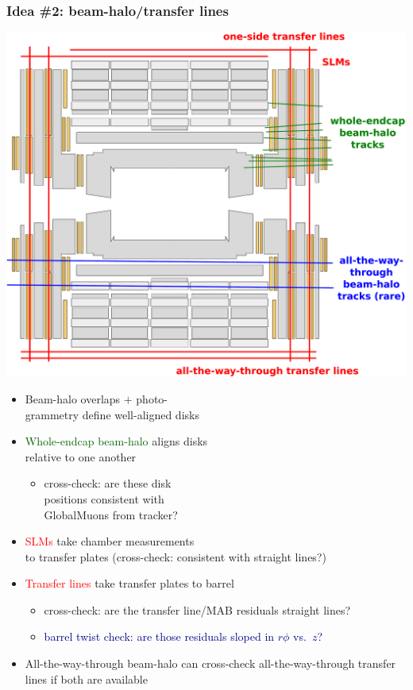 \documentclass[compress]{beamer}
\begin{document}
\begin{frame}
\frametitle{Idea \#2: beam-halo/transfer lines}

\vspace{0.2 cm}
\hfill \includegraphics[width=0.4\linewidth]{beamhalo_transferlines.pdf}

\vspace{-4 cm}
\begin{itemize}
\item Beam-halo overlaps $+$ photo- \\ grammetry define well-aligned disks

\item \textcolor{darkgreen}{Whole-endcap beam-halo} aligns disks \\ relative to one another
\begin{itemize}
\item cross-check: are these disk \\ positions consistent with \\ GlobalMuons from tracker?
\end{itemize}

\item \textcolor{red}{SLMs} take chamber measurements \\ to transfer plates (cross-check: consistent with straight lines?)

\item \textcolor{red}{Transfer lines} take transfer plates to barrel
\begin{itemize}
\item cross-check: are the transfer line/MAB residuals straight lines?
\item \textcolor{darkblue}{barrel twist check: are those residuals sloped in $r\phi$ vs.\ $z$?}
\end{itemize}

\item All-the-way-through beam-halo can cross-check all-the-way-through transfer lines if both are available
\end{itemize}

\end{frame}
\end{document}
